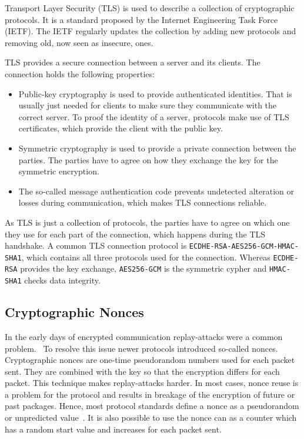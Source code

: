 Transport Layer Security (TLS) is used to describe a collection of cryptographic
protocols. It is a standard proposed by the Internet Engineering Task Force
(IETF). The IETF regularly updates the collection by adding new protocols and
removing old, now seen as insecure, ones.

TLS provides a secure connection between a server and its clients. The
connection holds the following properties:
\begin{itemize}
  \item Public-key cryptography is used to provide authenticated identities.
  That is usually just needed for clients to make sure they communicate with the
  correct server. To proof the identity of a server, protocols make use of TLS
  certificates, which provide the client with the public key.
  \item Symmetric cryptography is used to provide a private connection between
  the parties. The parties have to agree on how they exchange the key for the
  symmetric encryption.
  \item The so-called message authentication code prevents undetected alteration
  or losses during communication, which makes TLS connections reliable.
\end{itemize}

As TLS is just a collection of protocols, the parties have to agree on which one
they use for each part of the connection, which happens during the TLS
handshake. A common TLS connection protocol is
\texttt{ECDHE-RSA-AES256-GCM-HMAC-SHA1}, which contains all three protocols used
for the connection. Whereas \texttt{ECDHE-RSA} provides the key exchange,
\texttt{AES256-GCM} is the  symmetric cypher and \texttt{HMAC-SHA1} checks data
integrity.


\subsection{Cryptographic Nonces}

In the early days of encrypted communication replay-attacks were a common
problem.~ To resolve this issue newer
protocols introduced so-called nonces. Cryptographic nonces are one-time
pseudorandom numbers used for each packet sent. They are combined with the key
so that the encryption differs for each packet. This technique makes
replay-attacks harder. In most cases, nonce reuse is a problem for the protocol
and results in breakage of the encryption of future or past packages. Hence,
most protocol standards define a nonce as a pseudorandom or unpredicted
value~\cite{noncegeneral}. It is also possible to use the nonce can as a counter
which has a random start value and increases for each packet sent.

